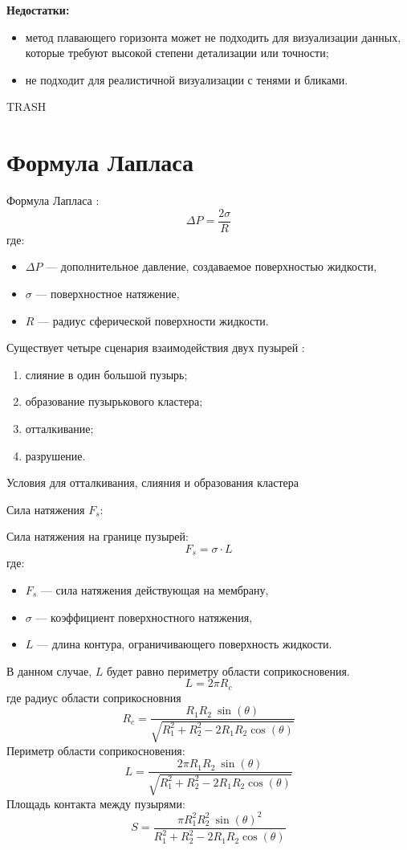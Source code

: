 \textbf{Недостатки:}
\begin{itemize}
	\item метод плавающего горизонта может не подходить для визуализации данных, которые требуют высокой степени детализации или точности;
	\item не подходит для реалистичной визуализации с тенями и бликами.
\end{itemize}

\clearpage








TRASH
\section{Формула Лапласа} 
Формула Лапласа \cite{laplace}:
\begin{equation}
	\Delta P = \frac{2\sigma}{R}
\end{equation}
где:
\begin{itemize}
	\item \(\Delta P\) --- дополнительное давление, создаваемое поверхностью жидкости,
	\item \(\sigma\) --- поверхностное натяжение,
	\item \(R\) --- радиус сферической поверхности жидкости.
\end{itemize}
Существует четыре сценария взаимодействия двух пузырей :
\begin{enumerate}
	\item слияние в один большой пузырь;
	\item образование пузырькового кластера; 
	\item отталкивание;
	\item разрушение.
\end{enumerate}
Условия для отталкивания, слияния и образования кластера

Сила натяжения $F_s$:

Сила натяжения на границе пузырей: \[ F_s = \sigma \cdot L \]
где:
\begin{itemize}
	\item $F_s$ --- сила натяжения действующая на мембрану,
	\item $\sigma$ --- коэффициент поверхностного натяжения,
	\item $L$ --- длина контура, ограничивающего поверхность жидкости.
\end{itemize}
В данном случае, $L$ будет равно периметру области соприкосновения.
\[ L = 2\pi R_{c} \]
где радиус области соприкосновния  \[R_{c} = \frac{R_{1}R_{2}\ \sin(\theta)}{\sqrt{R_{1}^2 + R_{2}^2 - 2R_{1}R_{2} \cos(\theta)}} \]
Периметр области соприкосновения: \[L = \frac{2\pi R_{1}R_{2}\ \sin(\theta)}{\sqrt{R_{1}^2 + R_{2}^2 - 2R_{1}R_{2} \cos(\theta)}}\]
Площадь контакта между пузырями: \[ S = \frac{\pi R_{1}^2R_{2}^2\ \sin(\theta)^2}{R_{1}^2 + R_{2}^2 - 2R_{1}R_{2} \cos(\theta)} \]

